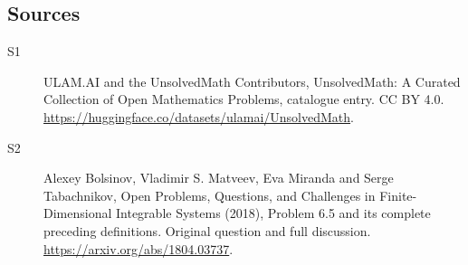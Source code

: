\documentclass[11pt]{article}
\begin{document}
\subsection{Sources}
\begin{description}
\item[\hypertarget{source:statement:1}{S1}] ULAM.AI and the UnsolvedMath Contributors, UnsolvedMath: A Curated Collection of Open Mathematics Problems, catalogue entry. CC BY 4.0. \url{https://huggingface.co/datasets/ulamai/UnsolvedMath}.
\item[\hypertarget{source:statement:2}{S2}] Alexey Bolsinov, Vladimir S. Matveev, Eva Miranda and Serge Tabachnikov, Open Problems, Questions, and Challenges in Finite-Dimensional Integrable Systems (2018), Problem 6.5 and its complete preceding definitions. Original question and full discussion. \url{https://arxiv.org/abs/1804.03737}.

\end{description}
\label{end:statement}
\end{document}

